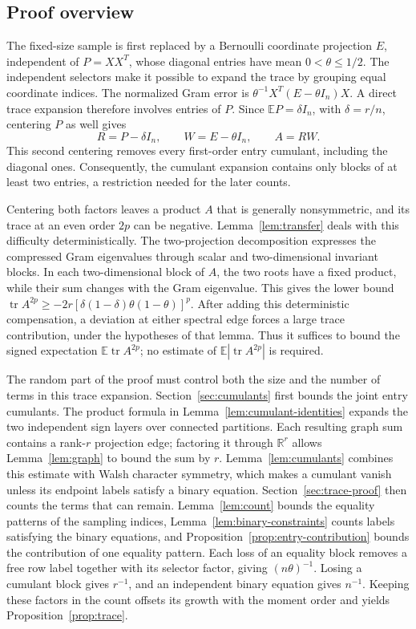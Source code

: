 \documentclass[11pt]{article}
\theoremstyle{definition}
\theoremstyle{remark}
\theoremstyle{plain}
\newcommand{\E}{\mathbb E}
\newcommand{\R}{\mathbb R}
\DeclareMathOperator{\tr}{tr}
\begin{document}
\subsection*{Proof overview}

The fixed-size sample is first replaced by a Bernoulli coordinate
projection $E$, independent of $P=XX^T$, whose diagonal entries
have mean $0<\theta\le1/2$. The independent selectors make it possible to
expand the trace by grouping equal coordinate indices. The normalized
Gram error is $\theta^{-1}X^T(E-\theta I_n)X$.
A direct trace expansion therefore involves entries of $P$.
Since $\E P=\delta I_n$, with $\delta=r/n$, centering $P$ as well gives
\[
 R=P-\delta I_n,\qquad W=E-\theta I_n,\qquad A=RW.
\]
This second centering removes every first-order entry cumulant,
including the diagonal ones. Consequently, the cumulant expansion
contains only blocks of at least two entries, a restriction needed
for the later counts.

Centering both factors leaves a product $A$ that is generally
nonsymmetric, and its trace at an even order $2p$ can be negative.
Lemma~\ref{lem:transfer} deals with this difficulty deterministically.
The two-projection decomposition expresses the compressed Gram
eigenvalues through scalar and two-dimensional invariant blocks.
In each two-dimensional block of $A$, the two roots have a fixed
product, while their sum changes with the Gram eigenvalue.
This gives the lower bound
$\tr A^{2p}\ge-2r[\delta(1-\delta)\theta(1-\theta)]^p$.
After adding this deterministic compensation, a deviation at either
spectral edge forces a large trace contribution, under the
hypotheses of that lemma. Thus it suffices to bound the signed
expectation $\E\tr A^{2p}$; no estimate of
$\E|\tr A^{2p}|$ is required.

The random part of the proof must control both the size and the
number of terms in this trace expansion. Section~\ref{sec:cumulants}
first bounds the joint entry cumulants. The product formula in
Lemma~\ref{lem:cumulant-identities} expands the two independent sign
layers over connected partitions. Each resulting graph sum contains
a rank-$r$ projection edge; factoring it through $\R^r$ allows
Lemma~\ref{lem:graph} to bound the sum by $r$.
Lemma~\ref{lem:cumulants} combines this estimate with Walsh character
symmetry, which makes a cumulant vanish unless its endpoint labels
satisfy a binary equation. Section~\ref{sec:trace-proof} then counts
the terms that can remain. Lemma~\ref{lem:count} bounds the equality
patterns of the sampling indices, Lemma~\ref{lem:binary-constraints}
counts labels satisfying the binary equations, and
Proposition~\ref{prop:entry-contribution} bounds the contribution of
one equality pattern. Each loss of an equality block removes a free
row label together with its selector factor, giving $(n\theta)^{-1}$.
Losing a cumulant block gives $r^{-1}$, and an independent binary
equation gives $n^{-1}$.
Keeping these factors in the count offsets its growth with the
moment order and yields Proposition~\ref{prop:trace}.
\end{document}
